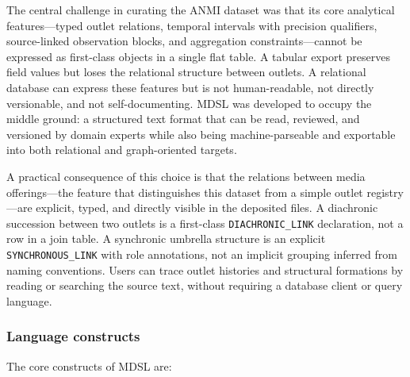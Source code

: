 \documentclass[11pt]{article}
\begin{document}
The central challenge in curating the ANMI dataset was that its core analytical features---typed outlet relations, temporal intervals with precision qualifiers, source-linked observation blocks, and aggregation constraints---cannot be expressed as first-class objects in a single flat table. A tabular export preserves field values but loses the relational structure between outlets. A relational database can express these features but is not human-readable, not directly versionable, and not self-documenting. MDSL was developed to occupy the middle ground: a structured text format that can be read, reviewed, and versioned by domain experts while also being machine-parseable and exportable into both relational and graph-oriented targets.

A practical consequence of this choice is that the relations between media offerings---the feature that distinguishes this dataset from a simple outlet registry---are explicit, typed, and directly visible in the deposited files. A diachronic succession between two outlets is a first-class \texttt{DIACHRONIC\_LINK} declaration, not a row in a join table. A synchronic umbrella structure is an explicit \texttt{SYNCHRONOUS\_LINK} with role annotations, not an implicit grouping inferred from naming conventions. Users can trace outlet histories and structural formations by reading or searching the source text, without requiring a database client or query language.

\subsubsection*{Language constructs}

The core constructs of MDSL are:
\end{document}

